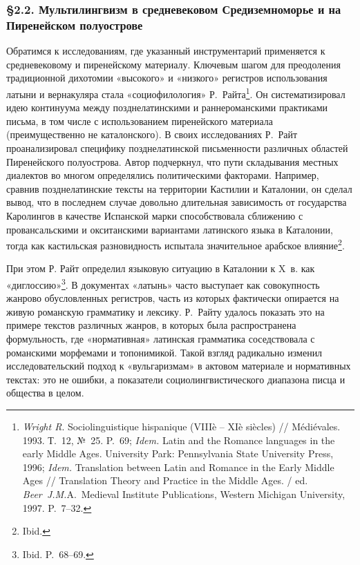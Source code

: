 \subsubsection*{§2.2. Мультилингвизм в средневековом Средиземноморье и на Пиренейском полуострове}

Обратимся к исследованиям, где указанный инструментарий применяется к средневековому и пиренейскому материалу. Ключевым шагом для преодоления традиционной дихотомии «высокого» и «низкого» регистров использования латыни и вернакуляра стала «социофилология» Р.~Райта\footnote{\emph{Wright R}. Sociolinguistique hispanique (VIIIè -- XIè siècles) // Médiévales. 1993. Т.~12, №~25. P.~69;\emph{ Idem. }Latin and the Romance languages in the early Middle Ages. University Park: Pennsylvania State University Press, 1996; \emph{Idem.} Translation between Latin and Romance in the Early Middle Ages // Translation Theory and Practice in the Middle Ages. / ed. \emph{Beer~J.M.}A.~Medieval Institute Publications, Western Michigan University, 1997. P.~7--32.}. Он систематизировал идею континуума между позднелатинскими и раннероманскими практиками письма, в том числе с использованием пиренейского материала (преимущественно не каталонского). В своих исследованиях Р.~Райт проанализировал специфику позднелатинской письменности различных областей Пиренейского полуострова. Автор подчеркнул, что пути складывания местных диалектов во многом определялись политическими факторами. Например, сравнив позднелатинские тексты на территории Кастилии и Каталонии, он сделал вывод, что в последнем случае довольно длительная зависимость от государства Каролингов в качестве Испанской марки способствовала сближению с провансальскими и окситанскими вариантами латинского языка в Каталонии, тогда как кастильская разновидность испытала значительное арабское влияние\footnote{Ibid.}.

При этом Р. Райт определил языковую ситуацию в Каталонии к X~в. как «диглоссию»\footnote{Ibid. P.~68--69.}. В документах «латынь» часто выступает как совокупность жанрово обусловленных регистров, часть из которых фактически опирается на живую романскую грамматику и лексику. Р.~Райту удалось показать это на примере текстов различных жанров, в которых была распространена формульность, где «нормативная» латинская грамматика соседствовала с романскими морфемами и топонимикой. Такой взгляд радикально изменил исследовательский подход к «вульгаризмам» в актовом материале и нормативных текстах: это не ошибки, а показатели социолингвистического диапазона писца и общества в целом.


